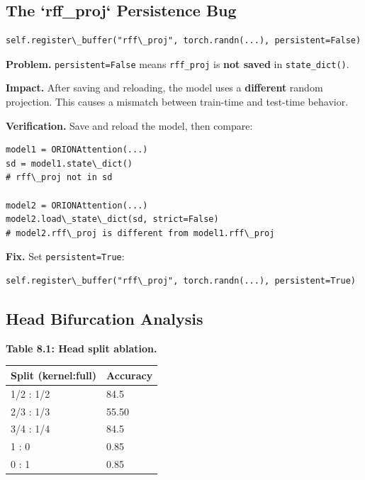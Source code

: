 \subsection{The `rff\_proj` Persistence Bug}

\begin{lstlisting}
self.register\_buffer("rff\_proj", torch.randn(...), persistent=False)
\end{lstlisting}

\textbf{Problem.} \texttt{persistent=False} means \texttt{rff\_proj} is \textbf{not saved} in 
\texttt{state\_dict()}.

\textbf{Impact.} After saving and reloading, the model uses a \textbf{different} 
random projection. This causes a mismatch between train-time and test-time 
behavior.

\textbf{Verification.} Save and reload the model, then compare:

\begin{lstlisting}
model1 = ORIONAttention(...)
sd = model1.state\_dict()
# rff\_proj not in sd

model2 = ORIONAttention(...)
model2.load\_state\_dict(sd, strict=False)
# model2.rff\_proj is different from model1.rff\_proj
\end{lstlisting}

\textbf{Fix.} Set \texttt{persistent=True}:

\begin{lstlisting}
self.register\_buffer("rff\_proj", torch.randn(...), persistent=True)
\end{lstlisting}

\subsection{Head Bifurcation Analysis}

\textbf{Table 8.1: Head split ablation.}

\begin{table}[H]
\centering
\small
\begin{tabular}{ll}
\toprule
\textbf{Split (kernel:full)} & \textbf{Accuracy} \\
\midrule
1/2 : 1/2 & 84.5 \\
2/3 : 1/3 & 55.50 \\
3/4 : 1/4 & 84.5 \\
1 : 0 & 0.85 \\
0 : 1 & 0.85 \\
\bottomrule
\end{tabular}
\end{table}

